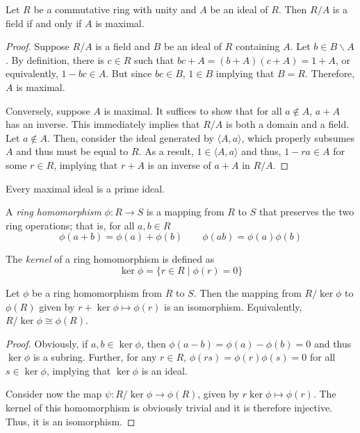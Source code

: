 \begin{theorem}
    Let $R$ be a commutative ring with unity and $A$ be an ideal of $R$. Then $R/A$ is a field if and only if $A$ is maximal.
\end{theorem}
\begin{proof}
    Suppose $R/A$ is a field and $B$ be an ideal of $R$ containing $A$. Let $b\in B\backslash A$. By definition, there is $c\in R$ such that $bc + A = (b + A)(c + A) = 1 + A$, or equivalently, $1 - bc\in A$. But since $bc\in B$, $1\in B$ implying that $B = R$. Therefore, $A$ is maximal.

    Conversely, suppose $A$ is maximal. It suffices to show that for all $a\notin A$, $a + A$ has an inverse. This immediately implies that $R/A$ is both a domain and a field. Let $a\notin A$. Then, consider the ideal generated by $\langle A, a\rangle$, which properly subsumes $A$ and thus must be equal to $R$. As a result, $1\in\langle A,a\rangle$ and thus, $1 - ra\in A$ for some $r\in R$, implying that $r + A$ is an inverse of $a + A$ in $R/A$.
\end{proof}

\begin{corollary}
    Every maximal ideal is a prime ideal.
\end{corollary}

\begin{definition}
    A \textit{ring homomorphism} $\phi:R\to S$ is a mapping from $R$ to $S$ that preserves the two ring operations; that is, for all $a,b\in R$
    \begin{equation*}
        \phi(a + b) = \phi(a) + \phi(b) \qquad \phi(ab) = \phi(a)\phi(b)
    \end{equation*}

    The \textit{kernel} of a ring homomorphism is defined as 
    \begin{equation*}
        \ker\phi = \{r\in R\mid \phi(r) = 0\}
    \end{equation*}
\end{definition}

\begin{theorem}
    Let $\phi$ be a ring homomorphism from $R$ to $S$. Then the mapping from $R/\ker\phi$ to $\phi(R)$ given by $r + \ker\phi\mapsto\phi(r)$ is an isomorphism. Equivalently, $R/\ker\phi\cong\phi(R)$.
\end{theorem}
\begin{proof}
    Obviously, if $a,b\in\ker\phi$, then $\phi(a - b) = \phi(a) - \phi(b) = 0$ and thus $\ker\phi$ is a subring. Further, for any $r\in R$, $\phi(rs) = \phi(r)\phi(s) = 0$ for all $s\in\ker\phi$, implying that $\ker\phi$ is an ideal.

    Consider now the map $\psi:R/\ker\phi\to\phi(R)$, given by $r\ker\phi\mapsto\phi(r)$. The kernel of this homomorphism is obviously trivial and it is therefore injective. Thus, it is an isomorphism.
\end{proof}

